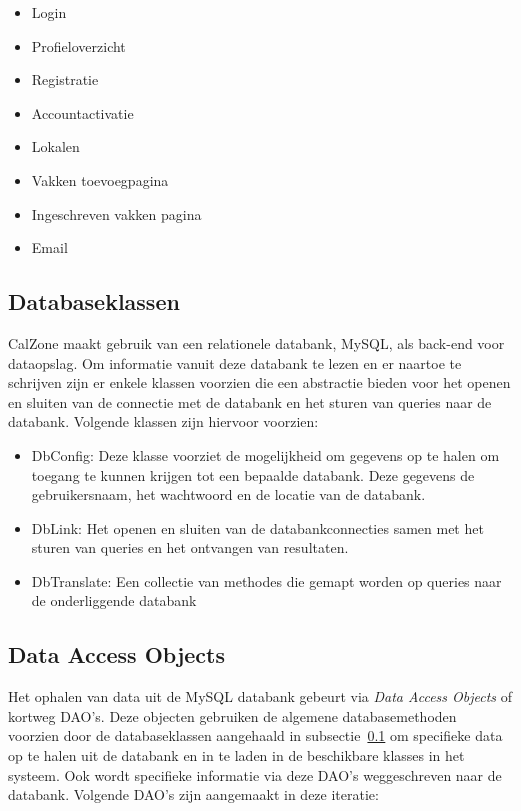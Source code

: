 \begin{itemize}
	\item Login
	\item Profieloverzicht
	\item Registratie
	\item Accountactivatie
	\item Lokalen
	\item Vakken toevoegpagina
	\item Ingeschreven vakken pagina
	\item Email
\end{itemize}

\subsection{Databaseklassen}
\label{subsec:databaseklassen}

CalZone maakt gebruik van een relationele databank, MySQL, als back-end voor dataopslag. 
Om informatie vanuit deze databank te lezen en er naartoe te schrijven zijn er enkele klassen voorzien die een abstractie bieden voor het openen en sluiten van de connectie met de databank en het sturen van queries naar de databank. 
Volgende klassen zijn hiervoor voorzien:

\begin{itemize}
	\item DbConfig: Deze klasse voorziet de mogelijkheid om gegevens op te halen om toegang te kunnen krijgen tot een bepaalde databank. 
	Deze gegevens de gebruikersnaam, het wachtwoord en de locatie van de databank. 
	\item DbLink: Het openen en sluiten van de databankconnecties samen met het sturen van queries en het ontvangen van resultaten.
	\item DbTranslate: Een collectie van methodes die gemapt worden op queries naar de onderliggende databank
\end{itemize} 

\subsection{Data Access Objects}
\label{subsec:dao}

Het ophalen van data uit de MySQL databank gebeurt via \emph{Data Access Objects} of kortweg DAO's. 
Deze objecten gebruiken de algemene databasemethoden voorzien door de databaseklassen aangehaald in subsectie~\ref{subsec:databaseklassen} om specifieke data op te halen uit de databank en in te laden in de beschikbare klasses in het systeem. 
Ook wordt specifieke informatie via deze DAO's weggeschreven naar de databank. 
Volgende DAO's zijn aangemaakt in deze iteratie:

